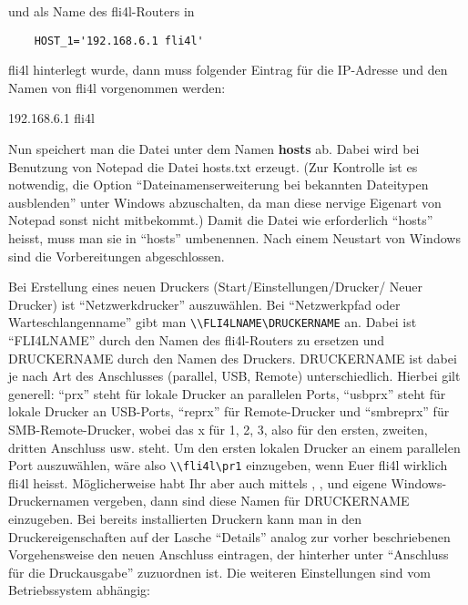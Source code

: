 \begin{enumerate}
    und als Name des fli4l-Routers in

\begin{example}
\begin{verbatim}
    HOST_1='192.168.6.1 fli4l'
\end{verbatim}
\end{example}

    fli4l hinterlegt wurde, dann muss folgender Eintrag für die IP-Adresse
    und den Namen von fli4l vorgenommen werden:

    192.168.6.1     fli4l

    Nun speichert man die Datei unter dem Namen \textbf{hosts}
    ab. Dabei wird bei Benutzung von Notepad die Datei hosts.txt erzeugt.
    (Zur Kontrolle ist es notwendig, die Option ``Dateinamenserweiterung bei
    bekannten Dateitypen ausblenden'' unter Windows abzuschalten, da man
    diese nervige Eigenart von Notepad sonst nicht mitbekommt.) Damit die
    Datei wie erforderlich ``hosts''
    heisst, muss man sie in ``hosts'' umbenennen. Nach einem Neustart von Windows
    sind die Vorbereitungen abgeschlossen.

    Bei Erstellung eines neuen Druckers (Start/Einstellungen/Drucker/ Neuer
    Drucker) ist ``Netzwerkdrucker'' auszuwählen. Bei ``Netzwerkpfad oder
    Warteschlangenname'' gibt man
    \verb+\\FLI4LNAME\DRUCKERNAME+
    an. Dabei ist ``FLI4LNAME'' durch den Namen des fli4l-Routers zu ersetzen
    und DRUCKERNAME durch den Namen des Druckers. DRUCKERNAME ist dabei
    je nach Art des Anschlusses (parallel, USB, Remote) unterschiedlich.
    Hierbei gilt generell:
    ``prx'' steht für lokale Drucker an parallelen Ports, ``usbprx'' steht für
    lokale Drucker an USB-Ports, ``reprx'' für Remote-Drucker und ``smbreprx''
    für SMB-Remote-Drucker, wobei das x für 1, 2, 3, also für den ersten,
    zweiten, dritten Anschluss usw. steht.
    Um den ersten lokalen Drucker an einem parallelen Port auszuwählen, wäre also
    \verb+\\fli4l\pr1+
    einzugeben, wenn Euer fli4l wirklich fli4l heisst.
    Möglicherweise habt Ihr aber auch mittels ,
    , 
    und  eigene Windows-Druckernamen
    vergeben, dann sind diese Namen für DRUCKERNAME einzugeben.
    Bei bereits installierten Druckern kann man in den Druckereigenschaften
    auf der Lasche ``Details'' analog zur vorher beschriebenen Vorgehensweise
    den neuen Anschluss eintragen, der hinterher unter ``Anschluss für die Druckausgabe''
    zuzuordnen ist. Die weiteren Einstellungen sind vom Betriebssystem abhängig:


\end{enumerate}
